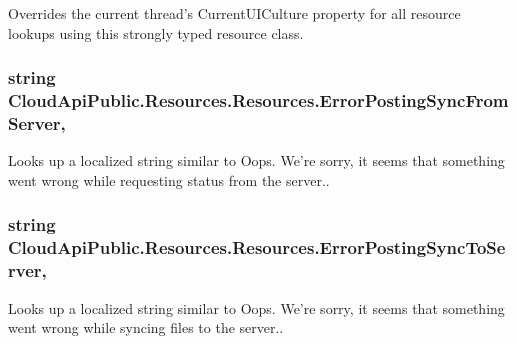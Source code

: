 Overrides the current thread's Current\-U\-I\-Culture property for all resource lookups using this strongly typed resource class. 

\hypertarget{class_cloud_api_public_1_1_resources_1_1_resources_a0c0b014f3adbc0748726c33e75f54510}{
\subsubsection[{Error\-Posting\-Sync\-From\-Server}]{\setlength{\rightskip}{0pt plus 5cm}string Cloud\-Api\-Public.\-Resources.\-Resources.\-Error\-Posting\-Sync\-From\-Server\hspace{0.3cm}{\ttfamily [static]}, {\ttfamily [get]}}}\label{class_cloud_api_public_1_1_resources_1_1_resources_a0c0b014f3adbc0748726c33e75f54510}


Looks up a localized string similar to Oops. We're sorry, it seems that something went wrong while requesting status from the server.. 

\hypertarget{class_cloud_api_public_1_1_resources_1_1_resources_aee243a146f3f50aa829353a1de9edfd6}{
\subsubsection[{Error\-Posting\-Sync\-To\-Server}]{\setlength{\rightskip}{0pt plus 5cm}string Cloud\-Api\-Public.\-Resources.\-Resources.\-Error\-Posting\-Sync\-To\-Server\hspace{0.3cm}{\ttfamily [static]}, {\ttfamily [get]}}}\label{class_cloud_api_public_1_1_resources_1_1_resources_aee243a146f3f50aa829353a1de9edfd6}


Looks up a localized string similar to Oops. We're sorry, it seems that something went wrong while syncing files to the server.. 

